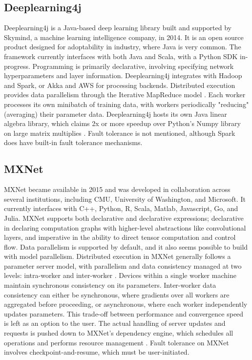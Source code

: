 \documentclass{article}
\begin{document}
\subsection{Deeplearning4j}
Deeplearning4j is a Java-based deep learning library built and supported by Skymind, a machine learning intelligence company, in 2014. It is an open source product designed for adoptability in industry, where Java is very common. The framework currently interfaces with both Java and Scala, with a Python SDK in-progress. Programming is primarily declarative, involving specifying network hyperparameters and layer information. Deeplearning4j integrates with Hadoop and Spark, or Akka and AWS for processing backends. Distributed execution provides data parallelism through the Iterative MapReduce model \cite{Itera38:online}. Each worker processes its own minibatch of training data, with workers periodically "reducing" (averaging) their parameter data. Deeplearning4j hosts its own Java linear algebra library, which claims 2x or more speedup over Python's Numpy library on large matrix multiplies \cite{ND4J'34:online}. Fault tolerance is not mentioned, although Spark does have built-in fault tolerance mechanisms. 

\subsection{MXNet}
MXNet became available in 2015 and was developed in collaboration across several institutions, including CMU, University of Washington, and Microsoft. It currently interfaces with C++, Python, R, Scala, Matlab, Javascript, Go, and Julia. MXNet supports both declarative and declarative expressions; declarative in declaring computation graphs with higher-level abstractions like convolutional layers, and imperative in the ability to direct tensor computation and control flow. Data parallelism is supported by default, and it also seems possible to build with model parallelism. Distributed execution in MXNet generally follows a parameter server model, with parallelism and data consistency managed at two levels: intra-worker and inter-worker \cite{chen2015mxnet}. Devices within a single worker machine maintain synchronous consistency on its parameters. Inter-worker data consistency can either be synchronous, where gradients over all workers are aggregated before proceeding, or asynchronous, where each worker independently updates parameters. This trade-off between performance and convergence speed is left as an option to the user. The actual handling of server updates and requests is pushed down to MXNet's dependency engine, which schedules all operations and performs resource management \cite{chen2015mxnet}. Fault tolerance on MXNet involves checkpoint-and-resume, which must be user-initiated. 
\end{document}
